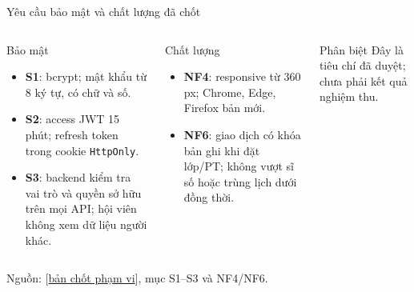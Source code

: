 \documentclass[aspectratio=169,10pt]{beamer}
\begin{document}
\begin{frame}{Yêu cầu bảo mật và chất lượng đã chốt}
  \small
  \begin{columns}[T,onlytextwidth]
      \begin{block}{Bảo mật}
        \begin{itemize}
          \item \textbf{S1}: bcrypt; mật khẩu từ 8 ký tự, có chữ và số.
          \item \textbf{S2}: access JWT 15 phút; refresh token trong cookie \texttt{HttpOnly}.
          \item \textbf{S3}: backend kiểm tra vai trò và quyền sở hữu trên mọi API; hội viên không xem dữ liệu người khác.
        \end{itemize}
      \end{block}
      \begin{block}{Chất lượng}
        \begin{itemize}
          \item \textbf{NF4}: responsive từ 360 px; Chrome, Edge, Firefox bản mới.
          \item \textbf{NF6}: giao dịch có khóa bản ghi khi đặt lớp/PT; không vượt sĩ số hoặc trùng lịch dưới đồng thời.
        \end{itemize}
      \end{block}
      \begin{alertblock}{Phân biệt}
        Đây là tiêu chí đã duyệt; chưa phải kết quả nghiệm thu.
      \end{alertblock}
  \end{columns}
  \vfill
  \scriptsize Nguồn: [\href{https://github.com/Ktin06/it3180_nhom6_gym_management/blob/main/docs/requirements/ban-chot-pham-vi.md}{bản chốt phạm vi}], mục S1--S3 và NF4/NF6.
\end{frame}
\end{document}
